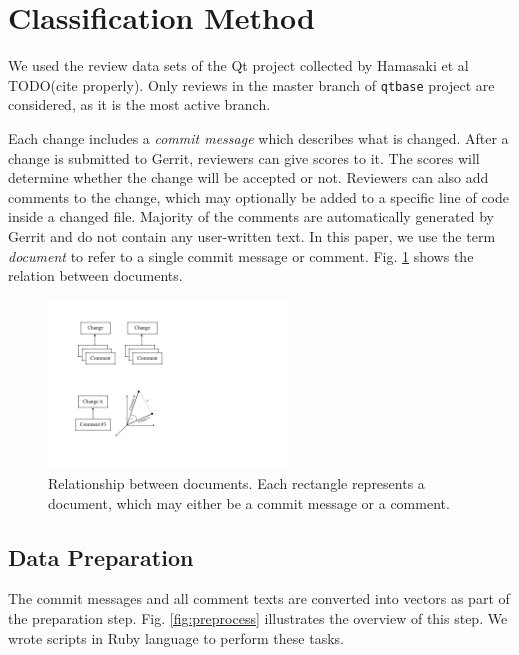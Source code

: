 \documentclass[conference]{IEEEtran}
\begin{document}
\section{Classification Method}

We used the review data sets of the Qt project collected by Hamasaki et al TODO(cite properly).
Only reviews in the master branch of \texttt{qtbase} project are considered,
as it is the most active branch.

Each change includes a \emph{commit message} which describes what is changed.
After a change is submitted to Gerrit, reviewers can give scores to it.
The scores will determine whether the change will be accepted or not.
Reviewers can also add comments to the change, which may optionally be added to a specific line of code inside a changed file.
Majority of the comments are automatically generated by Gerrit and do not contain any user-written text.
In this paper, we use the term \emph{document} to refer to a single commit message or comment.
Fig. \ref{fig:hierarchy} shows the relation between documents.

\begin{figure}[h]
\centering
\includegraphics[width=2.5in]{hierarchy}
\caption{Relationship between documents.
Each rectangle represents a document, which may either be a commit message or a comment.}
\label{fig:hierarchy}
\end{figure}

\subsection{Data Preparation}

The commit messages and all comment texts are converted into vectors as part of the preparation step.
Fig. \ref{fig:preprocess} illustrates the overview of this step.
We wrote scripts in Ruby language to perform these tasks.
\end{document}
